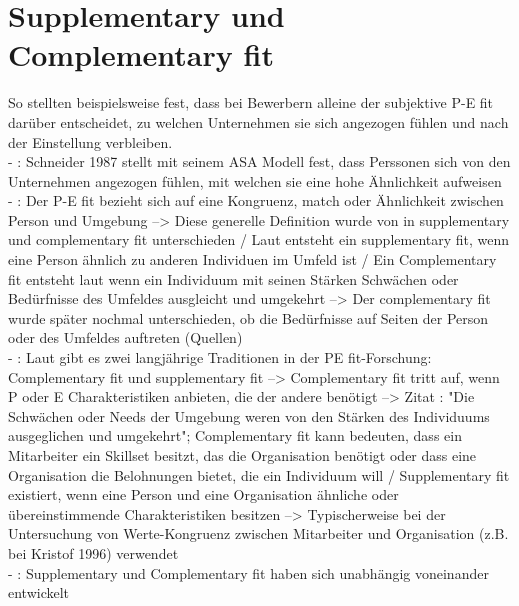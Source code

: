 \section{Supplementary und Complementary fit}
\label{ch:personEnvironmentFit:supplementaryUndComplementary}
So stellten beispielsweise \textcite[S. 1ff.]{schneider:1995} fest, dass bei Bewerbern alleine der subjektive P-E fit darüber entscheidet, zu welchen Unternehmen sie sich angezogen fühlen und nach der Einstellung verbleiben. \\
- \cite[S. 1]{cable:1997}: Schneider 1987 stellt mit seinem ASA Modell fest, dass Perssonen sich von den Unternehmen angezogen fühlen, mit welchen sie eine hohe Ähnlichkeit aufweisen \\
- \cite[S. 4]{edwards:2008}: Der P-E fit bezieht sich auf eine Kongruenz, match oder Ähnlichkeit zwischen Person und Umgebung --> Diese generelle Definition wurde von \textcite{muchinsky:1987} in supplementary und complementary fit unterschieden / Laut \cite[S. 269]{muchinsky:1987} entsteht ein supplementary fit, wenn eine Person ähnlich zu anderen Individuen im Umfeld ist / Ein Complementary fit entsteht laut \cite[S. 271]{muchinsky:1987} wenn ein Individuum mit seinen Stärken Schwächen oder Bedürfnisse des Umfeldes ausgleicht und umgekehrt --> Der complementary fit wurde später nochmal unterschieden, ob die Bedürfnisse auf Seiten der Person oder des Umfeldes auftreten (Quellen) \\
- \cite[S. 1]{edwards:2004}: Laut \textcite{muchinsky:1987} gibt es zwei langjährige Traditionen in der PE fit-Forschung: Complementary fit und supplementary fit --> Complementary fit tritt auf, wenn P oder E Charakteristiken anbieten, die der andere benötigt --> Zitat \cite{muchinsky:1987}: "Die Schwächen oder Needs der Umgebung weren von den Stärken des Individuums ausgeglichen und umgekehrt"; Complementary fit kann bedeuten, dass ein Mitarbeiter ein Skillset besitzt, das die Organisation benötigt oder dass eine Organisation die Belohnungen bietet, die ein Individuum will / Supplementary fit existiert, wenn eine Person und eine Organisation ähnliche oder übereinstimmende Charakteristiken besitzen --> Typischerweise bei der Untersuchung von Werte-Kongruenz zwischen Mitarbeiter und Organisation (z.B. bei Kristof 1996) verwendet \\
- \cite[S. 1]{edwards:2004}: Supplementary und Complementary fit haben sich unabhängig voneinander entwickelt \\

